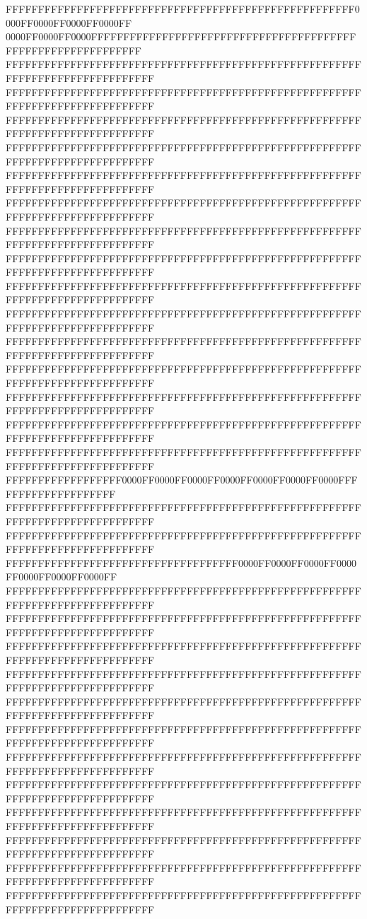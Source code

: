 FFFFFFFFFFFFFFFFFFFFFFFFFFFFFFFFFFFFFFFFFFFFFFFFFFFFFF0000FF0000FF0000FF0000FF
0000FF0000FF0000FFFFFFFFFFFFFFFFFFFFFFFFFFFFFFFFFFFFFFFFFFFFFFFFFFFFFFFFFFFFFF
FFFFFFFFFFFFFFFFFFFFFFFFFFFFFFFFFFFFFFFFFFFFFFFFFFFFFFFFFFFFFFFFFFFFFFFFFFFFFF
FFFFFFFFFFFFFFFFFFFFFFFFFFFFFFFFFFFFFFFFFFFFFFFFFFFFFFFFFFFFFFFFFFFFFFFFFFFFFF
FFFFFFFFFFFFFFFFFFFFFFFFFFFFFFFFFFFFFFFFFFFFFFFFFFFFFFFFFFFFFFFFFFFFFFFFFFFFFF
FFFFFFFFFFFFFFFFFFFFFFFFFFFFFFFFFFFFFFFFFFFFFFFFFFFFFFFFFFFFFFFFFFFFFFFFFFFFFF
FFFFFFFFFFFFFFFFFFFFFFFFFFFFFFFFFFFFFFFFFFFFFFFFFFFFFFFFFFFFFFFFFFFFFFFFFFFFFF
FFFFFFFFFFFFFFFFFFFFFFFFFFFFFFFFFFFFFFFFFFFFFFFFFFFFFFFFFFFFFFFFFFFFFFFFFFFFFF
FFFFFFFFFFFFFFFFFFFFFFFFFFFFFFFFFFFFFFFFFFFFFFFFFFFFFFFFFFFFFFFFFFFFFFFFFFFFFF
FFFFFFFFFFFFFFFFFFFFFFFFFFFFFFFFFFFFFFFFFFFFFFFFFFFFFFFFFFFFFFFFFFFFFFFFFFFFFF
FFFFFFFFFFFFFFFFFFFFFFFFFFFFFFFFFFFFFFFFFFFFFFFFFFFFFFFFFFFFFFFFFFFFFFFFFFFFFF
FFFFFFFFFFFFFFFFFFFFFFFFFFFFFFFFFFFFFFFFFFFFFFFFFFFFFFFFFFFFFFFFFFFFFFFFFFFFFF
FFFFFFFFFFFFFFFFFFFFFFFFFFFFFFFFFFFFFFFFFFFFFFFFFFFFFFFFFFFFFFFFFFFFFFFFFFFFFF
FFFFFFFFFFFFFFFFFFFFFFFFFFFFFFFFFFFFFFFFFFFFFFFFFFFFFFFFFFFFFFFFFFFFFFFFFFFFFF
FFFFFFFFFFFFFFFFFFFFFFFFFFFFFFFFFFFFFFFFFFFFFFFFFFFFFFFFFFFFFFFFFFFFFFFFFFFFFF
FFFFFFFFFFFFFFFFFFFFFFFFFFFFFFFFFFFFFFFFFFFFFFFFFFFFFFFFFFFFFFFFFFFFFFFFFFFFFF
FFFFFFFFFFFFFFFFFFFFFFFFFFFFFFFFFFFFFFFFFFFFFFFFFFFFFFFFFFFFFFFFFFFFFFFFFFFFFF
FFFFFFFFFFFFFFFFFF0000FF0000FF0000FF0000FF0000FF0000FF0000FFFFFFFFFFFFFFFFFFFF
FFFFFFFFFFFFFFFFFFFFFFFFFFFFFFFFFFFFFFFFFFFFFFFFFFFFFFFFFFFFFFFFFFFFFFFFFFFFFF
FFFFFFFFFFFFFFFFFFFFFFFFFFFFFFFFFFFFFFFFFFFFFFFFFFFFFFFFFFFFFFFFFFFFFFFFFFFFFF
FFFFFFFFFFFFFFFFFFFFFFFFFFFFFFFFFFFF0000FF0000FF0000FF0000FF0000FF0000FF0000FF
FFFFFFFFFFFFFFFFFFFFFFFFFFFFFFFFFFFFFFFFFFFFFFFFFFFFFFFFFFFFFFFFFFFFFFFFFFFFFF
FFFFFFFFFFFFFFFFFFFFFFFFFFFFFFFFFFFFFFFFFFFFFFFFFFFFFFFFFFFFFFFFFFFFFFFFFFFFFF
FFFFFFFFFFFFFFFFFFFFFFFFFFFFFFFFFFFFFFFFFFFFFFFFFFFFFFFFFFFFFFFFFFFFFFFFFFFFFF
FFFFFFFFFFFFFFFFFFFFFFFFFFFFFFFFFFFFFFFFFFFFFFFFFFFFFFFFFFFFFFFFFFFFFFFFFFFFFF
FFFFFFFFFFFFFFFFFFFFFFFFFFFFFFFFFFFFFFFFFFFFFFFFFFFFFFFFFFFFFFFFFFFFFFFFFFFFFF
FFFFFFFFFFFFFFFFFFFFFFFFFFFFFFFFFFFFFFFFFFFFFFFFFFFFFFFFFFFFFFFFFFFFFFFFFFFFFF
FFFFFFFFFFFFFFFFFFFFFFFFFFFFFFFFFFFFFFFFFFFFFFFFFFFFFFFFFFFFFFFFFFFFFFFFFFFFFF
FFFFFFFFFFFFFFFFFFFFFFFFFFFFFFFFFFFFFFFFFFFFFFFFFFFFFFFFFFFFFFFFFFFFFFFFFFFFFF
FFFFFFFFFFFFFFFFFFFFFFFFFFFFFFFFFFFFFFFFFFFFFFFFFFFFFFFFFFFFFFFFFFFFFFFFFFFFFF
FFFFFFFFFFFFFFFFFFFFFFFFFFFFFFFFFFFFFFFFFFFFFFFFFFFFFFFFFFFFFFFFFFFFFFFFFFFFFF
FFFFFFFFFFFFFFFFFFFFFFFFFFFFFFFFFFFFFFFFFFFFFFFFFFFFFFFFFFFFFFFFFFFFFFFFFFFFFF
FFFFFFFFFFFFFFFFFFFFFFFFFFFFFFFFFFFFFFFFFFFFFFFFFFFFFFFFFFFFFFFFFFFFFFFFFFFFFF
